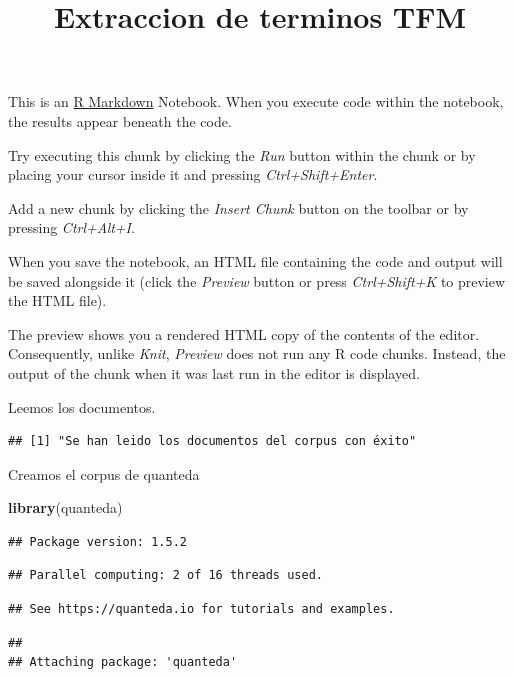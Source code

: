 \documentclass[]{article}
\title{Extraccion de terminos TFM}
\author{}
\date{\vspace{-2.5em}}
\newenvironment{Shaded}{\begin{snugshade}}{\end{snugshade}}
\newcommand{\KeywordTok}[1]{\textcolor[rgb]{0.13,0.29,0.53}{\textbf{#1}}}
\newcommand{\NormalTok}[1]{#1}
\begin{document}
\maketitle

This is an \href{http://rmarkdown.rstudio.com}{R Markdown} Notebook.
When you execute code within the notebook, the results appear beneath
the code.

Try executing this chunk by clicking the \emph{Run} button within the
chunk or by placing your cursor inside it and pressing
\emph{Ctrl+Shift+Enter}.

Add a new chunk by clicking the \emph{Insert Chunk} button on the
toolbar or by pressing \emph{Ctrl+Alt+I}.

When you save the notebook, an HTML file containing the code and output
will be saved alongside it (click the \emph{Preview} button or press
\emph{Ctrl+Shift+K} to preview the HTML file).

The preview shows you a rendered HTML copy of the contents of the
editor. Consequently, unlike \emph{Knit}, \emph{Preview} does not run
any R code chunks. Instead, the output of the chunk when it was last run
in the editor is displayed.

Leemos los documentos.

\begin{verbatim}
## [1] "Se han leido los documentos del corpus con éxito"
\end{verbatim}

Creamos el corpus de quanteda

\begin{Shaded}
\begin{Highlighting}[]
\KeywordTok{library}\NormalTok{(quanteda)}
\end{Highlighting}
\end{Shaded}

\begin{verbatim}
## Package version: 1.5.2
\end{verbatim}

\begin{verbatim}
## Parallel computing: 2 of 16 threads used.
\end{verbatim}

\begin{verbatim}
## See https://quanteda.io for tutorials and examples.
\end{verbatim}

\begin{verbatim}
## 
## Attaching package: 'quanteda'
\end{verbatim}
\end{document}

